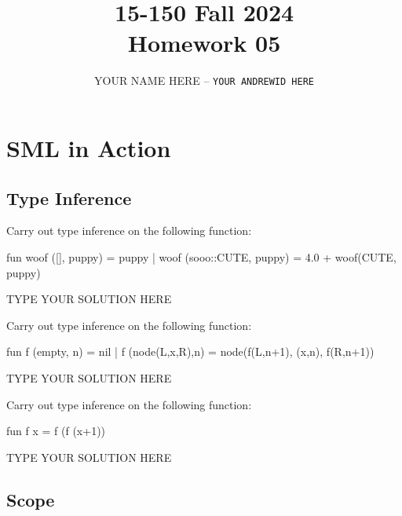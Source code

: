 \documentclass[11pt]{article}
\title{\textbf{15-150 Fall 2024\\Homework 05}}
\author{YOUR NAME HERE -- \texttt{YOUR ANDREWID HERE}}
\begin{document}
\maketitle

\section{SML in Action}

\subsection{Type Inference}

\begin{task}{2} %
Carry out type inference on the following function:
\begin{sml}[numbers=left]
fun woof ([], puppy) = puppy
  | woof (sooo::CUTE, puppy) = 4.0 + woof(CUTE, puppy)
\end{sml}
\end{task}

\begin{solution}
TYPE YOUR SOLUTION HERE
\end{solution}


\begin{task}{2} %
Carry out type inference on the following function:
\begin{sml}[numbers=left]
fun f (empty, n) = nil
  | f (node(L,x,R),n) = node(f(L,n+1), (x,n), f(R,n+1))
\end{sml}
\end{task}

\begin{solution}
TYPE YOUR SOLUTION HERE
\end{solution}


\begin{task}{2} %
Carry out type inference on the following function:
\begin{sml}[numbers=left]
fun f x = f (f (x+1))
\end{sml}
\end{task}

\begin{solution}
TYPE YOUR SOLUTION HERE
\end{solution}


\subsection{Scope}
\end{document}
